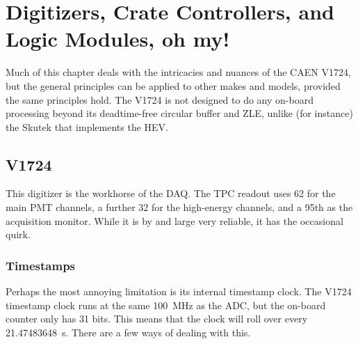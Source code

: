 \chapter{Digitizers, Crate Controllers, and Logic Modules, oh my!}

Much of this chapter deals with the intricacies and nuances of the CAEN V1724, but the general principles can be applied to other makes and models, provided the same principles hold.
The V1724 is not designed to do any on-board processing beyond its deadtime-free circular buffer and ZLE, unlike (for instance) the Skutek that implements the HEV.

\section{V1724}

This digitizer is the workhorse of the DAQ.
The TPC readout uses 62 for the main PMT channels, a further 32 for the high-energy channels, and a 95th as the acquisition monitor.
While it is by and large very reliable, it has the occasional quirk.

\subsection{Timestamps}

Perhaps the most annoying limitation is its internal timestamp clock.
The V1724 timestamp clock runs at the same \SI{100}{\mega\hertz} as the ADC, but the on-board counter only has 31 bits.
This means that the clock will roll over every \SI{21.47483648}{\second}.
There are a few ways of dealing with this. 

